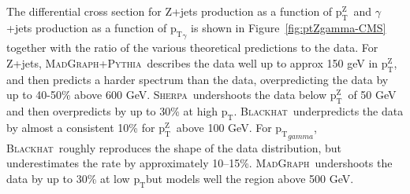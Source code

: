 \documentclass[a4paper,11pt,notoc]{article}
\newcommand{\pt}{\ensuremath{\mathrm{p_T}}}
\newcommand{\ptZ}{\ensuremath{\mathrm{p_T^{Z}}}}
\newcommand{\PYTHIA}{\textsc{Pythia}}
\newcommand{\SHERPA}{\textsc{Sherpa}}
\newcommand{\BLACKHAT}{\textsc{Blackhat}}
\newcommand{\MADGRAPH}{\textsc{MadGraph}}
\begin{document}

The differential cross section for Z+jets production as a function of \ptZ\ and $\gamma$+jets production as a function of $\pt_{\gamma}$ is shown in Figure~\ref{fig:ptZgamma-CMS} together with the ratio of the various theoretical predictions to the data.
For Z+jets, \MADGRAPH+\PYTHIA\ describes the data well up to approx 150 geV in \ptZ, and then predicts a harder spectrum than the data, overpredicting the data by up to 40-50\% above 600 GeV. \SHERPA\ undershoots the data below \ptZ\ of 50 GeV and then overpredicts by up to 30\% at high \pt. \BLACKHAT\ underpredicts the data by almost a consistent 10\% for \ptZ\ above 100 GeV. 
For $\pt_{gamma}$, \BLACKHAT\ roughly reproduces the shape of the data distribution, but underestimates the rate by approximately 10–15\%. \MADGRAPH\ undershoots the data by up to 30\% at low \pt but models well the region above 500 GeV.


\end{document}

